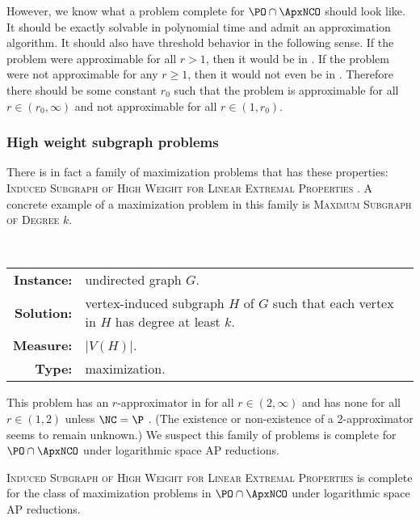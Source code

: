 \documentclass[]{article}
\begin{document}
However, we know what a problem complete for $\PO \cap \ApxNCO$ should look like.
It should be exactly solvable in polynomial time and admit an \NC{} approximation algorithm.
It should also have threshold behavior in the following sense.
If the problem were approximable for all $r > 1$, then it would be in \NCAS.
If the problem were not approximable for any $r \geq 1$, then it would not even be in \ApxNCO.
Therefore there should be some constant $r_0$ such that the problem is approximable for all $r \in (r_0, \infty)$ and not approximable for all $r \in (1, r_0)$.

\subsubsection{High weight subgraph problems}

There is in fact a family of maximization problems that has these properties: \textsc{Induced Subgraph of High Weight for Linear Extremal Properties} \cite[Chapter~3]{dsst97}.
A concrete example of a maximization problem in this family is \textsc{Maximum Subgraph of Degree $k$}.

\begin{definition}
  \mbox{} \\
  \begin{tabular}{r p{9.5cm}}
    \textbf{Instance:} & undirected graph $G$. \\
    \textbf{Solution:} & vertex-induced subgraph $H$ of $G$ such that each vertex in $H$ has degree at least $k$. \\
    \textbf{Measure:} & $|V(H)|$. \\
    \textbf{Type:} & maximization.
  \end{tabular}
\end{definition}

This problem has an $r$-approximator in \FNC{} for all $r \in (2, \infty)$ and has none for all $r \in (1, 2)$ unless $\NC = \P$ \cite{am84}.
(The existence or non-existence of a 2-approximator seems to remain unknown.)
We suspect this family of problems is complete for $\PO \cap \ApxNCO$ under logarithmic space AP reductions.

\begin{conjecture}
  \textsc{Induced Subgraph of High Weight for Linear Extremal Properties} is complete for the class of maximization problems in $\PO \cap \ApxNCO$ under logarithmic space AP reductions.
\end{conjecture}
\end{document}

